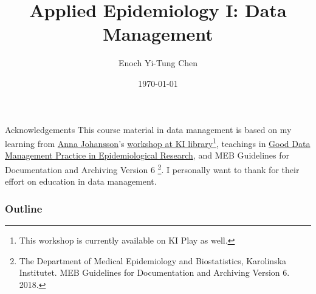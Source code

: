 \documentclass{beamer}
\title[Applied Epi I: Data Management]{Applied Epidemiology I: Data Management}
\date{\today}
\author[Enoch Yi-Tung Chen]{Enoch Yi-Tung Chen}
\institute[MEB]{Department of Medical Epidemiology and Biostatistics, Karolinska Insitutet}
\begin{document}
\begin{frame}
\maketitle 
\end{frame}

\begin{frame}{Acknowledgements}
This course material in data management is based on my learning from \href{https://staff.ki.se/people/annajo}{Anna Johansson}'s \href{https://play.ki.se/media/Data+Management+and+research+documentation+for+researchers/0_h64ki6v7?_ga=2.131118287.1557257458.1589785892-1364153581.1557067020}{workshop at KI library}\footnote{This workshop is currently available on KI Play as well. }, teachings in \href{https://kiwas.ki.se/katalog/katalog/kurs/851;jsessionid=e42ee2c1f6b081f28bf83e3d0321?lang=en}{Good Data Management Practice in Epidemiological Research}, and MEB Guidelines for Documentation and Archiving Version 6 \footnote{The Department of Medical Epidemiology and Biostatistics, Karolinska Institutet. MEB Guidelines for Documentation and Archiving Version 6. 2018.}. I personally want to thank for their effort on education in data management.

\end{frame}

\begin{frame}
\addtolength{\leftskip}{1cm}
\begin{minipage}{\textwidth}
\vspace{0.5cm}
\frametitle{Outline}
    \tableofcontents[hideallsubsections]
\end{minipage}
\end{frame}

\end{document}
